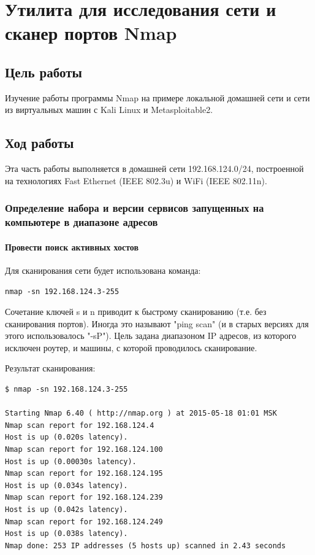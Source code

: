 \newpage
\section{Утилита для исследования сети и сканер портов Nmap}

\subsection{Цель работы}

Изучение работы программы Nmap на примере локальной домашней сети и сети из виртуальных машин с Kali Linux и Metasploitable2.

\subsection{Ход работы}

Эта часть работы выполняется в домашней сети 192.168.124.0/24, построенной на технологиях Fast Ethernet (IEEE 802.3u) и WiFi (IEEE 802.11n).

\subsubsection{Определение набора и версии сервисов запущенных на компьютере в диапазоне адресов}

\paragraph{Провести поиск активных хостов} Для сканирования сети будет использована команда:
\begin{Verbatim}[frame=single]
nmap -sn 192.168.124.3-255
\end{Verbatim}

Сочетание ключей s и n приводит к быстрому сканированию (т.е. без сканирования портов). Иногда это называют "ping scan" (и в старых версиях для этого использовалось "-sP"). Цель задана диапазоном IP адресов, из которого исключен роутер, и машины, с которой проводилось сканирование.

Результат сканирования:
\begin{Verbatim}[frame=single]
$ nmap -sn 192.168.124.3-255

Starting Nmap 6.40 ( http://nmap.org ) at 2015-05-18 01:01 MSK
Nmap scan report for 192.168.124.4
Host is up (0.020s latency).
Nmap scan report for 192.168.124.100
Host is up (0.00030s latency).
Nmap scan report for 192.168.124.195
Host is up (0.034s latency).
Nmap scan report for 192.168.124.239
Host is up (0.042s latency).
Nmap scan report for 192.168.124.249
Host is up (0.038s latency).
Nmap done: 253 IP addresses (5 hosts up) scanned in 2.43 seconds
\end{Verbatim}


